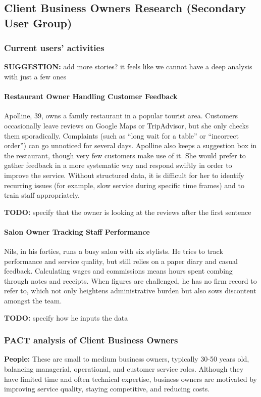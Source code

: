 \documentclass[]{VUMIFTemplateClass}
\newcommand{\todocomment}[1]{%
    \begin{tcolorbox}[colback=red!20, colframe=red!60, arc=0pt, outer arc=0pt, boxrule=1pt, left=3pt, right=3pt, top=3pt, bottom=3pt]
        \textbf{\textcolor{orange!70!black}{TODO:}} #1
    \end{tcolorbox}
}
\newcommand{\suggestioncomment}[1]{%
    \definecolor{lime}{RGB}{50,205,50}%
    \begin{tcolorbox}[colback=lime!15, colframe=lime!60, arc=0pt, outer arc=0pt, boxrule=1pt, left=3pt, right=3pt, top=3pt, bottom=3pt]
        \textbf{\textcolor{lime!70!black}{SUGGESTION:}} #1
    \end{tcolorbox}%
}
\newcommand{\subsubsubsection}[1]{\paragraph{#1}}
\begin{document}
\subsection{Client Business Owners Research (Secondary User Group)}

\subsubsection{Current users' activities}
\suggestioncomment{add more stories? it feels like we cannot have a deep analysis with just a few ones}

\subsubsubsection{Restaurant Owner Handling Customer Feedback}

Apolline, 39, owns a family restaurant in a popular tourist area. Customers
occasionally leave reviews on Google Maps or TripAdvisor, but she only checks
them sporadically. Complaints (such as “long wait for a table” or “incorrect
order”) can go unnoticed for several days. Apolline also keeps a suggestion box
in the restaurant, though very few customers make use of it. She would prefer to
gather feedback in a more systematic way and respond swiftly in order to improve
the service. Without structured data, it is difficult for her to identify
recurring issues (for example, slow service during specific time frames) and to
train staff appropriately.

\todocomment{specify that the owner is looking at the reviews after the first sentence}

\subsubsubsection{Salon Owner Tracking Staff Performance}

Nils, in his forties, runs a busy salon with six stylists. He tries to track
performance and service quality, but still relies on a paper diary and casual
feedback. Calculating wages and commissions means hours spent combing through
notes and receipts. When figures are challenged, he has no firm record to refer
to, which not only heightens administrative burden but also sows discontent
amongst the team.
\todocomment{specify how he inputs the data}

\subsubsection{PACT analysis of Client Business Owners}
    \textbf{People:} These are small to medium business owners, typically 30-50
    years old, balancing managerial, operational, and customer service roles.
    Although they have limited time and often technical expertise, business
    owners are motivated by improving service quality, staying competitive, and
    reducing costs.
\end{document}
